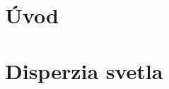 \documentclass[12pt,a4paper,titlepage,final]{book}
\begin{document}
\tableofcontents

\newpage
\chapter{Úvod}

\chapter{Disperzia svetla}







\end{document}
